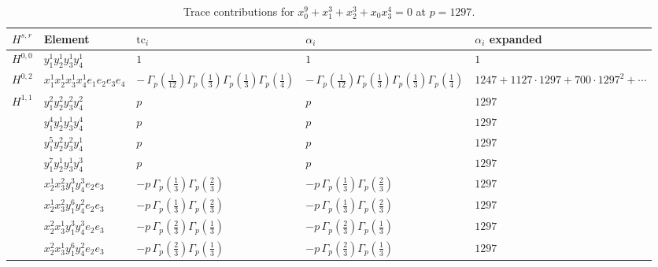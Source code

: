 \documentclass[11pt]{article}
\begin{document}
\begin{table}[ht]
\centering
\caption{Trace contributions for $x_0^{9} + x_1^{3} + x_2^{3} + x_0 x_3^{4} = 0$ at $p=1297$.}\label{tab:deformed-14}
\renewcommand{\arraystretch}{1.1}
{\scriptsize
\begin{tabular}{@{}lllll@{}}
\toprule
$H^{s,r}$ & Element & $\mathrm{tc}_i$ & $\alpha_i$ & $\alpha_i$ expanded \\
\midrule
$H^{0,0}$ & $y_{1}^{1} y_{2}^{1} y_{3}^{1} y_{4}^{1}$ & $1$ & $1$ & $1$ \\
\midrule
$H^{0,2}$ & $x_{1}^{1} x_{2}^{1} x_{3}^{1} x_{4}^{1}  e_{1} e_{2} e_{3} e_{4}$ & $- \, \Gamma_p \left( \frac{1}{12} \right) \Gamma_p \left( \frac{1}{3} \right) \Gamma_p \left( \frac{1}{3} \right) \Gamma_p \left( \frac{1}{4} \right)$ & $- \, \Gamma_p \left( \frac{1}{12} \right) \Gamma_p \left( \frac{1}{3} \right) \Gamma_p \left( \frac{1}{3} \right) \Gamma_p \left( \frac{1}{4} \right)$ & $1247{+}1127{\cdot}1297{+}700{\cdot}1297^{2}{+}\cdots$ \\
\midrule
$H^{1,1}$ & $y_{1}^{2} y_{2}^{2} y_{3}^{2} y_{4}^{2}$ & $p \,$ & $p \,$ & $1297$ \\
 & $y_{1}^{4} y_{2}^{1} y_{3}^{1} y_{4}^{4}$ & $p \,$ & $p \,$ & $1297$ \\
 & $y_{1}^{5} y_{2}^{2} y_{3}^{2} y_{4}^{1}$ & $p \,$ & $p \,$ & $1297$ \\
 & $y_{1}^{7} y_{2}^{1} y_{3}^{1} y_{4}^{3}$ & $p \,$ & $p \,$ & $1297$ \\
 & $x_{2}^{1} x_{3}^{2} y_{1}^{3} y_{4}^{3} e_{2} e_{3}$ & $- p \, \Gamma_p \left( \frac{1}{3} \right) \Gamma_p \left( \frac{2}{3} \right)$ & $- p \, \Gamma_p \left( \frac{1}{3} \right) \Gamma_p \left( \frac{2}{3} \right)$ & $1297$ \\
 & $x_{2}^{1} x_{3}^{2} y_{1}^{6} y_{4}^{2} e_{2} e_{3}$ & $- p \, \Gamma_p \left( \frac{1}{3} \right) \Gamma_p \left( \frac{2}{3} \right)$ & $- p \, \Gamma_p \left( \frac{1}{3} \right) \Gamma_p \left( \frac{2}{3} \right)$ & $1297$ \\
 & $x_{2}^{2} x_{3}^{1} y_{1}^{3} y_{4}^{3} e_{2} e_{3}$ & $- p \, \Gamma_p \left( \frac{2}{3} \right) \Gamma_p \left( \frac{1}{3} \right)$ & $- p \, \Gamma_p \left( \frac{2}{3} \right) \Gamma_p \left( \frac{1}{3} \right)$ & $1297$ \\
 & $x_{2}^{2} x_{3}^{1} y_{1}^{6} y_{4}^{2} e_{2} e_{3}$ & $- p \, \Gamma_p \left( \frac{2}{3} \right) \Gamma_p \left( \frac{1}{3} \right)$ & $- p \, \Gamma_p \left( \frac{2}{3} \right) \Gamma_p \left( \frac{1}{3} \right)$ & $1297$ \\

\end{tabular}}
\end{table}
\end{document}
